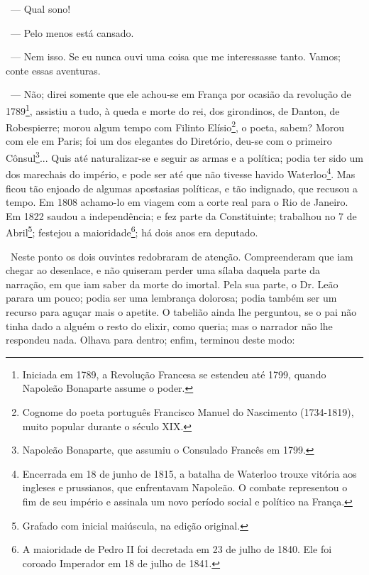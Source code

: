~--- Qual sono!

~--- Pelo menos está cansado.

~--- Nem isso. Se eu nunca ouvi uma coisa que me interessasse tanto.
Vamos; conte essas aventuras.

~--- Não; direi somente que ele achou-se em França por ocasião da
revolução de 1789\footnote{Iniciada em 1789, a Revolução Francesa se
  estendeu até 1799, quando Napoleão Bonaparte assume o poder.},
assistiu a tudo, à queda e morte do rei, dos girondinos, de Danton, de
Robespierre; morou algum tempo com Filinto Elísio\footnote{Cognome do
  poeta português Francisco Manuel do Nascimento (1734-1819), muito
  popular durante o século XIX.}, o poeta, sabem? Morou com ele em
Paris; foi um dos elegantes do Diretório, deu-se com o primeiro
Cônsul\footnote{Napoleão Bonaparte, que assumiu o Consulado Francês em
  1799.}... Quis até naturalizar-se e seguir as armas e a política;
podia ter sido um dos marechais do império, e pode ser até que não
tivesse havido Waterloo\footnote{Encerrada em 18 de junho de 1815, a
  batalha de Waterloo trouxe vitória aos ingleses e prussianos, que
  enfrentavam Napoleão. O combate representou o fim de seu império e
  assinala um novo período social e político na França.}. Mas ficou tão
enjoado de algumas apostasias políticas, e tão indignado, que recusou a
tempo. Em 1808 achamo-lo em viagem com a corte real para o Rio de
Janeiro. Em 1822 saudou a independência; e fez parte da Constituinte;
trabalhou no 7 de Abril\footnote{Grafado com inicial maiúscula, na
  edição original.}; festejou a maioridade\footnote{A maioridade de
  Pedro II foi decretada em 23 de julho de 1840. Ele foi coroado
  Imperador em 18 de julho de 1841.}; há dois anos era deputado.

~Neste ponto os dois ouvintes redobraram de atenção. Compreenderam que
iam chegar ao desenlace, e não quiseram perder uma sílaba daquela parte
da narração, em que iam saber da morte do imortal. Pela sua parte, o Dr.
Leão parara um pouco; podia ser uma lembrança dolorosa; podia também ser
um recurso para aguçar mais o apetite. O tabelião ainda lhe perguntou,
se o pai não tinha dado a alguém o resto do elixir, como queria; mas o
narrador não lhe respondeu nada. Olhava para dentro; enfim, terminou
deste modo:

